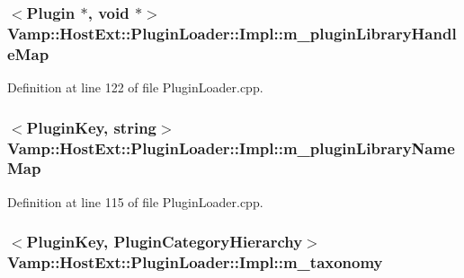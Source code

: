 \subsubsection[{\texorpdfstring{m\+\_\+plugin\+Library\+Handle\+Map}{m_pluginLibraryHandleMap}}]{$<${\bf Plugin} $\ast$, {\bf void} $\ast$$>$ Vamp\+::\+Host\+Ext\+::\+Plugin\+Loader\+::\+Impl\+::m\+\_\+plugin\+Library\+Handle\+Map\hspace{0.3cm}{\ttfamily [protected]}}\hypertarget{class_vamp_1_1_host_ext_1_1_plugin_loader_1_1_impl_a1c3cee03d20e669c8b9379247a222600}{}\label{class_vamp_1_1_host_ext_1_1_plugin_loader_1_1_impl_a1c3cee03d20e669c8b9379247a222600}


Definition at line 122 of file Plugin\+Loader.\+cpp.

\subsubsection[{\texorpdfstring{m\+\_\+plugin\+Library\+Name\+Map}{m_pluginLibraryNameMap}}]{$<${\bf Plugin\+Key}, {\bf string}$>$ Vamp\+::\+Host\+Ext\+::\+Plugin\+Loader\+::\+Impl\+::m\+\_\+plugin\+Library\+Name\+Map\hspace{0.3cm}{\ttfamily [protected]}}\hypertarget{class_vamp_1_1_host_ext_1_1_plugin_loader_1_1_impl_a59f6310a3bb71f761b635d06408713f3}{}\label{class_vamp_1_1_host_ext_1_1_plugin_loader_1_1_impl_a59f6310a3bb71f761b635d06408713f3}


Definition at line 115 of file Plugin\+Loader.\+cpp.

\subsubsection[{\texorpdfstring{m\+\_\+taxonomy}{m_taxonomy}}]{$<${\bf Plugin\+Key}, {\bf Plugin\+Category\+Hierarchy}$>$ Vamp\+::\+Host\+Ext\+::\+Plugin\+Loader\+::\+Impl\+::m\+\_\+taxonomy\hspace{0.3cm}{\ttfamily [protected]}}\hypertarget{class_vamp_1_1_host_ext_1_1_plugin_loader_1_1_impl_a2ba901c7e59ece349b715d4a3fec7b04}{}\label{class_vamp_1_1_host_ext_1_1_plugin_loader_1_1_impl_a2ba901c7e59ece349b715d4a3fec7b04}



